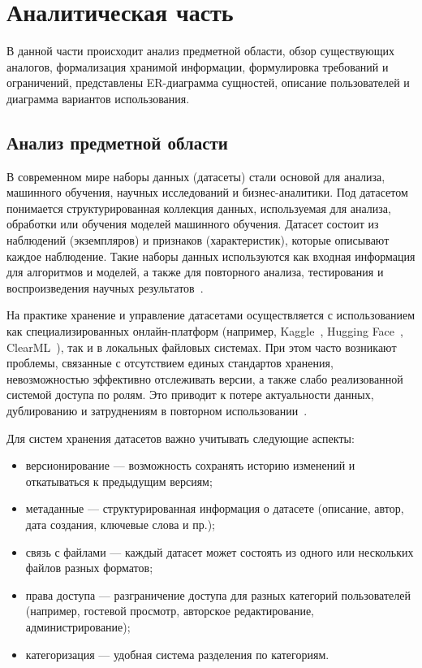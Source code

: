 \chapter{Аналитическая часть}

В данной части происходит анализ предметной области, обзор существующих аналогов,
формализация хранимой информации, формулировка требований и ограничений,
представлены ER-диаграмма сущностей, описание пользователей
и диаграмма вариантов использования.

\section{Анализ предметной области}

В современном мире наборы данных (датасеты) стали основой для анализа,
машинного обучения, научных исследований и бизнес-аналитики. Под датасетом понимается структурированная коллекция данных,
используемая для анализа, обработки или обучения моделей машинного обучения.
Датасет состоит из наблюдений (экземпляров) и признаков (характеристик), которые описывают каждое наблюдение.
Такие наборы данных используются как входная информация для алгоритмов и моделей, а также для повторного анализа,
тестирования и воспроизведения научных результатов~\cite{intro1}.

На практике хранение и управление датасетами осуществляется с использованием как специализированных
онлайн-платформ (например, Kaggle~\cite{kaggle}, Hugging Face~\cite{hg}, ClearML~\cite{cml}), так и в
локальных файловых системах.
При этом часто возникают проблемы, связанные с отсутствием единых стандартов хранения, невозможностью эффективно
отслеживать версии, а также слабо реализованной системой доступа по ролям.
Это приводит к потере актуальности данных, дублированию и затруднениям в повторном использовании~\cite{bp}.

Для систем хранения датасетов важно учитывать следующие аспекты:
\begin{itemize}
    \item версионирование — возможность сохранять историю изменений и откатываться к предыдущим версиям;

    \item метаданные — структурированная информация о датасете (описание, автор, дата создания, ключевые слова и пр.);

    \item связь с файлами — каждый датасет может состоять из одного или нескольких файлов разных форматов;

    \item права доступа — разграничение доступа для разных категорий пользователей (например, гостевой просмотр, авторское редактирование, администрирование);

    \item категоризация — удобная система разделения по категориям.
\end{itemize}

